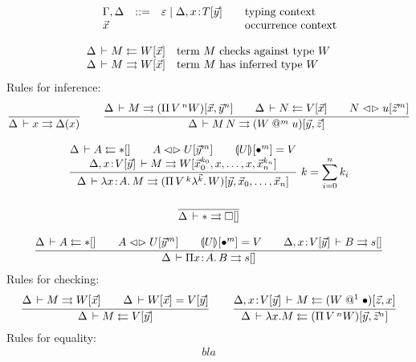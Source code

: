\documentclass[a4paper]{article}
\makeatletter
\newcommand{\ovar}{\mathord{\bullet}}
\newcommand{\olam}[1]{\lambda^{#1}.\,}
\newcommand{\opi}[2]{\Pi\,#1\,^{#2}}
\newcommand{\lrhd}{\mathrel{\mathord{\lhd}\mathord{\rhd}}}
\newcommand{\osyn}[3]{#1 \lrhd \esubst{#2}{#3}}
\renewcommand{\esubst}[2]{#1[#2]}
\renewcommand{\cempty}{\varepsilon}
\newcommand{\oclos}[2]{#1[#2]}
\newcommand{\ochk}[4]{#1 \der #2 \jchk \oclos{#4}{#3}}
\newcommand{\oinf}[4]{#1 \der #2 \jinf \oclos{#4}{#3}}
\newcommand{\vapp}[1]{\mathrel{@^{#1}}}
\newcommand{\evalid}[2]{\dent{#1}{}[\ovar^{#2}]}
\makeatother
\begin{document}
\[
\begin{array}{lllrl@{\qquad}l}
&& \Gamma,\Delta & ::= & \cempty \mid \Delta, x \of \oclos{T}{\vec y} 
  & \mbox{typing context}
\\
&& \vec x &&& \mbox{occurrence context} \\
\end{array}
\]

\[
\begin{array}{ll}
  \ochk \Delta M {\vec x} W & \mbox{term $M$ checks against type $W$}
  \\
  \oinf \Delta M {\vec x} W & \mbox{term $M$ has inferred type $W$}
  \\
\end{array}
\]
Rules for inference:
\begin{gather*}
  \ru{}{\Delta \der x \jinf \Delta(x)}
\qquad
  \ru{\oinf \Delta M {\vec x,{\vec y}^n} {(\opi V n W)} \qquad
      \ochk \Delta N {\vec x} V \qquad
      \osyn N u {{\vec z}^m}
    }{\oinf \Delta {M\,N} {\vec y,\vec z} {(W \vapp m u)}} 
\\[2ex]
  \rux{\ochk \Delta A {} \ttype \qquad
      \osyn A U {{\vec y}^m} \qquad
      \evalid U m = V \\
      \oinf {\Delta, x \of \oclos V {\vec y}} M 
            {{\vec x_0}^{k_0},x,\dots,x,{\vec x_n}^{k_n}} W
    }{\oinf \Delta {\lambda x \of A.\,M} {\vec y,\vec x_0,\dots,\vec x_n} 
            {(\opi V {k} {\olam {\vec k} W})}
    }{k = \sum_{i=0}^n k_i}
\\[2ex]
  \ru{}{\oinf \Delta \ttype {} \tkind}
\\[2ex]
  \ru{\ochk \Delta A {} \ttype \qquad
      \osyn A U {{\vec y}^m} \qquad
      \evalid U m = V \qquad
      \oinf {\Delta, x \of \oclos V {\vec y}} B {} s
    }{\oinf \Delta {\Pi x \of A.\,B} {} s}
\end{gather*}
Rules for checking:
\begin{gather*}
  \ru{\oinf \Delta M {\vec x} W \qquad
      \Delta \der \oclos W {\vec x} = \oclos V {\vec y}
    }{\ochk \Delta M {\vec y} V}
\qquad
  \ru{\ochk {\Delta, x \of \oclos V {\vec y}} M {\vec z,x} {(W \vapp 1 \ovar)}
    }{\ochk \Delta {\lambda x.M} {\vec y,{\vec z}^n} {(\opi V n W)}}
\end{gather*}
Rules for equality:
\begin{gather*}
  bla
\end{gather*}
\end{document}
